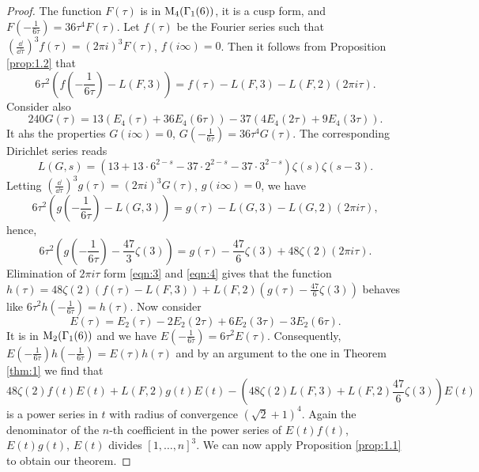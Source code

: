 \begin{proof}
    The function $F(\tau)$ is in $\mathrm{M}_4(\Gamma_1(6))$, it is a cusp form, and $F(-\frac{1}{6\tau}) = 36 \tau^4 F(\tau)$.
    Let $f(\tau)$ be the Fourier series such that $(\frac{\dd}{\dd \tau})^{3} f(\tau) = (2 \pi i )^{3} F(\tau)$, $f(i \infty) = 0$.
    Then it follows from Proposition \ref{prop:1.2} that
    \begin{equation}
        \label{eqn:3}
        6 \tau^2 \left(f\left(-\frac{1}{6\tau}\right) - L(F, 3)\right) = f(\tau) - L(F, 3) - L(F, 2) (2 \pi i \tau).
    \end{equation}
    Consider also
    $$
        240 G(\tau) = 13 (E_4(\tau) + 36 E_4(6\tau)) - 37 (4E_4(2\tau) + 9E_4(3\tau)).
    $$
    It ahs the properties $G(i\infty) = 0$, $G(-\frac{1}{6\tau}) = 36 \tau^4 G(\tau)$.
    The corresponding Dirichlet series reads
    $$
        L(G, s) = (13 + 13 \cdot 6^{2-s} - 37 \cdot 2^{2-s} - 37 \cdot 3^{2-s}) \zeta(s) \zeta(s - 3).
    $$
    Letting $(\frac{\dd}{\dd \tau})^{3} g(\tau) = (2\pi i)^{3} G(\tau)$, $g(i\infty) = 0$, we have
    $$
        6 \tau^2 \left(g\left(-\frac{1}{6\tau}\right) - L(G, 3)\right) = g(\tau) - L(G, 3) - L(G, 2) (2 \pi i \tau),
    $$
    hence,
    \begin{equation}
        \label{eqn:4}
        6 \tau^2 \left(g\left(-\frac{1}{6\tau}\right) - \frac{47}{3}\zeta(3)\right) = g(\tau) - \frac{47}{6} \zeta(3) + 48 \zeta(2) (2\pi i \tau).
    \end{equation}
    Elimination of $2\pi i \tau$ form \eqref{eqn:3} and \eqref{eqn:4} gives that the function $h(\tau) = 48 \zeta(2) (f(\tau) - L(F, 3)) + L(F, 2) (g(\tau) - \frac{47}{6}\zeta(3))$ behaves like $6 \tau^2 h(-\frac{1}{6\tau}) = h(\tau)$.
    Now consider
    $$
        E(\tau) = E_2(\tau) - 2E_2(2 \tau) + 6 E_2(3\tau) - 3 E_2(6\tau).
    $$
    It is in $\mathrm{M}_2(\Gamma_1(6))$ and we have $E(-\frac{1}{6\tau}) = 6 \tau^2 E(\tau)$.
    Consequently, $E(-\frac{1}{6\tau}) h(-\frac{1}{6\tau}) = E(\tau) h(\tau)$ and by an argument to the one in Theorem \ref{thm:1} we find that
    $$
        48 \zeta(2) f(t) E(t) + L(F, 2) g(t) E(t) - \left(48 \zeta(2) L(F, 3) + L(F, 2) \frac{47}{6} \zeta(3) \right) E(t)
    $$
    is a power series in $t$ with radius of convergence $(\sqrt{2} + 1)^4$.
    Again the denominator of the $n$-th coefficient in the power series of $E(t) f(t)$, $E(t) g(t)$, $E(t)$ divides $[1, \dots, n]^3$.
    We can now apply Proposition \ref{prop:1.1} to obtain our theorem.
\end{proof}

